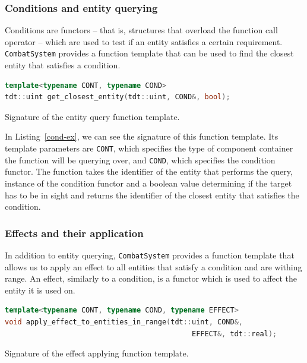 \subsubsection{Conditions and entity querying}

Conditions are functors -- that is, structures that overload the function call operator -- which are used to test if an entity satisfies
a certain requirement. \texttt{CombatSystem} provides a function template that can be used to find the closest entity that satisfies
a condition.

\begin{listing}
    \centering
    \begin{lstlisting}[language=C++]
template<typename CONT, typename COND>
tdt::uint get_closest_entity(tdt::uint, COND&, bool);
    \end{lstlisting}
    \caption{Signature of the entity query function template.}
    \label{cond-ex}
\end{listing}

In Listing~\ref{cond-ex}, we can see the signature of this function template. Its template parameters are \texttt{CONT}, which specifies
the type of component container the function will be querying over, and \texttt{COND}, which specifies the condition functor. The function
takes the identifier of the entity that performs the query, instance of the condition functor and a boolean value determining if the
target has to be in sight and returns the identifier of the closest entity that satisfies the condition.

\subsubsection{Effects and their application}

In addition to entity querying, \texttt{CombatSystem} provides a function template that allows us to apply an effect to all entities
that satisfy a condition and are withing range. An effect, similarly to a condition, is a functor which is used to affect the entity
it is used on.

\begin{listing}
    \centering
    \begin{lstlisting}[language=C++]
template<typename CONT, typename COND, typename EFFECT>
void apply_effect_to_entities_in_range(tdt::uint, COND&,
                                            EFFECT&, tdt::real);
    \end{lstlisting}
    \caption{Signature of the effect applying function template.}
    \label{effect-ex}
\end{listing}

